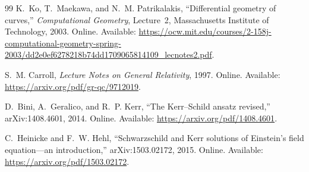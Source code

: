 \documentclass[11pt]{article}
\numberwithin{equation}{section}
\begin{document}
\begin{thebibliography}{99}
K.~Ko, T.~Maekawa, and N.~M. Patrikalakis,
``Differential geometry of curves,'' \emph{Computational Geometry},
Lecture~2, Massachusetts Institute of Technology, 2003.
Online. Available: \url{https://ocw.mit.edu/courses/2-158j-computational-geometry-spring-2003/dd2e0ef6278218b74dd1709065814109_lecnotes2.pdf}.

S.~M. Carroll, \emph{Lecture Notes on General Relativity}, 1997.
Online. Available: \url{https://arxiv.org/pdf/gr-qc/9712019}.

D.~Bini, A.~Geralico, and R.~P. Kerr,
``The Kerr--Schild ansatz revised,'' arXiv:1408.4601, 2014.
Online. Available: \url{https://arxiv.org/pdf/1408.4601}.

C.~Heinicke and F.~W. Hehl,
``Schwarzschild and Kerr solutions of Einstein's field equation---an
introduction,'' arXiv:1503.02172, 2015.
Online. Available: \url{https://arxiv.org/pdf/1503.02172}.

\end{thebibliography}
\end{document}
